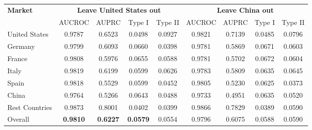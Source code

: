 \begin{table}[t]
{\begin{tabular}{l|cccc|cccc}
        \multirow{2}{*}{\textbf{Market}} 
        & \multicolumn{4}{c|}{\textbf{Leave United States out}} 
        & \multicolumn{4}{c}{\textbf{Leave China out}} \\
        \cline{2-9}
         & AUCROC & AUPRC & Type I & Type II
         & AUCROC & AUPRC & Type I & Type II \\
        \hline
        United States  & 0.9787 & 0.6523 & 0.0498 & 0.0927 & 0.9821 & 0.7139 & 0.0485 & 0.0796 \\
        Germany        & 0.9799 & 0.6093 & 0.0660 & 0.0398 & 0.9781 & 0.5869 & 0.0671 & 0.0603 \\
        France         & 0.9808 & 0.5976 & 0.0655 & 0.0588 & 0.9781 & 0.5702 & 0.0672 & 0.0604 \\
        Italy          & 0.9819 & 0.6199 & 0.0599 & 0.0626 & 0.9783 & 0.5809 & 0.0635 & 0.0645 \\
        Spain          & 0.9818 & 0.5529 & 0.0599 & 0.0452 & 0.9805 & 0.5230 & 0.0625 & 0.0373 \\
        China          & 0.9764 & 0.5266 & 0.0643 & 0.0488 & 0.9733 & 0.4951 & 0.0635 & 0.0520 \\
        Rest Countries & 0.9873 & 0.8001 & 0.0402 & 0.0399 & 0.9866 & 0.7829 & 0.0389 & 0.0590 \\
        \hline
        Overall        & \textbf{0.9810} & \textbf{0.6227} & \textbf{0.0579} & 0.0554 & 0.9796 & 0.6075 & 0.0588 & 0.0590 \\
        \hline
    \end{tabular}}
    \label{tab:leave_one_country_out}
\end{table}


